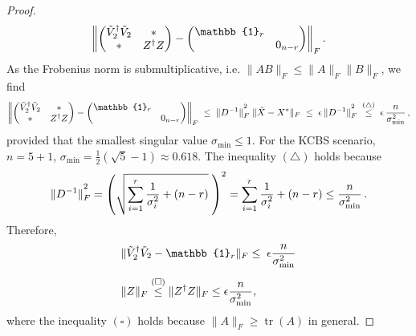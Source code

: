 \begin{proof}
\begin{equation*}
\left\|
\begin{pmatrix}
\Tilde{V}_2^{\dag}\Tilde{V}_2 & * \\
* & Z^{\dag}Z
\end{pmatrix}
-
\begin{pmatrix}
\mathbb{1}_r & \\
& 0_{n-r}
\end{pmatrix}
\right\|_F.
\end{equation*}
As the Frobenius norm is submultiplicative, i.e. $\|AB\|_F\leq\|A\|_F\|B\|_F$, we find
\begin{equation*}
\left\|
\begin{pmatrix}
\Tilde{V}_2^{\dag}\Tilde{V}_2 & * \\
* & Z^{\dag}Z
\end{pmatrix}
-
\begin{pmatrix}
\mathbb{1}_r & \\
& 0_{n-r}
\end{pmatrix}
\right\|_F\;\leq\;\|D^{-1}\|^{\textstyle ^2}_F\;\|\Tilde{X}-X^{*}\|_F\; \leq\; \epsilon\thinspace\|D^{-1}\|_F^{\textstyle ^2}\;\stackrel{(\bigtriangleup)}{\leq}\;\epsilon\thinspace \frac{n}{\sigma_{\text{min}}^2}\thinspace,
\end{equation*}
provided that the smallest singular value $\sigma_{\text{min}}\leq 1$. For the KCBS scenario, $n=5+1$, $\sigma_{\text{min}}=\frac{1}{2}(\sqrt{5}-1)\approx 0.618$. The inequality $(\bigtriangleup)$ holds because
\begin{equation*}
\|D^{-1}\|_F^{\textstyle ^2} = \left(\sqrt{\sum_{i=1}^r \frac{1}{\sigma_i^2}+(n-r)}\;\right)^2=\sum_{i=1}^r\frac{1}{\sigma_i^2}+(n-r)\leq\frac{n}{\sigma_{\text{min}}^2}\thinspace. 
\end{equation*}
Therefore,
\begin{align*}
& \|\Tilde{V}_2^{\dag}\Tilde{V}_2-\mathbb{1}_r\|_F\leq\;\epsilon\frac{n}{\sigma_{\text{min}}^2} \\[0.5em]
& \|Z\|_F \stackrel{(\square)}{\leq} \|Z^{\dag}Z\|_F \leq \epsilon\frac{n}{\sigma_{\text{min}}^2},
\end{align*}
where the inequality $(\square)$ holds because $\|A\|_F\geq\operatorname{tr}(A)$ in general. 


\end{proof}
